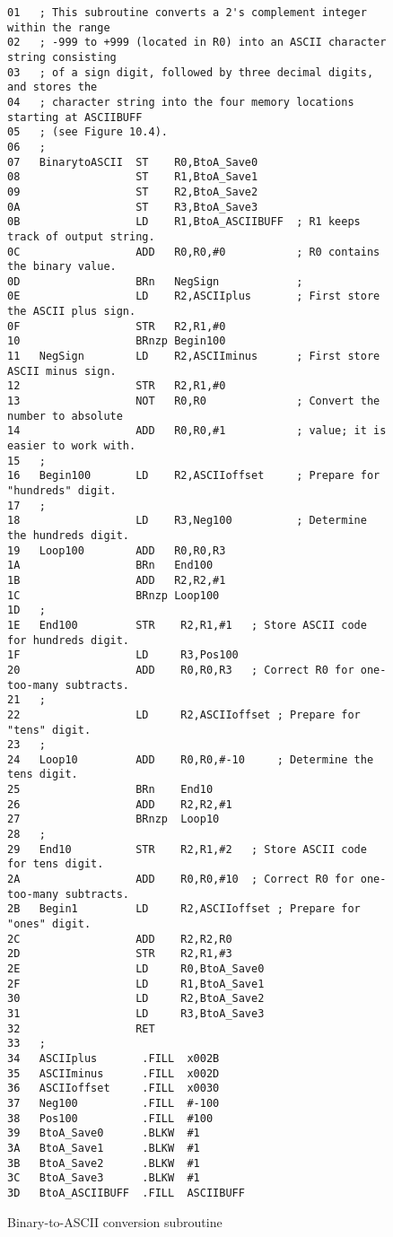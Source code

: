 \documentclass{patt}
\begin{document}
\begin{figure}[h!]
\begin{minipage}{36pc}
\begin{Verbatim}[fontsize=\fontsize{9}{11}\selectfont]
01   ; This subroutine converts a 2's complement integer within the range 
02   ; -999 to +999 (located in R0) into an ASCII character string consisting 
03   ; of a sign digit, followed by three decimal digits, and stores the 
04   ; character string into the four memory locations starting at ASCIIBUFF 
05   ; (see Figure 10.4).
06   ;
07   BinarytoASCII  ST    R0,BtoA_Save0
08                  ST    R1,BtoA_Save1
09                  ST    R2,BtoA_Save2
0A                  ST    R3,BtoA_Save3
0B                  LD    R1,BtoA_ASCIIBUFF  ; R1 keeps track of output string.
0C                  ADD   R0,R0,#0           ; R0 contains the binary value.
0D                  BRn   NegSign            ;
0E                  LD    R2,ASCIIplus       ; First store the ASCII plus sign.
0F                  STR   R2,R1,#0
10                  BRnzp Begin100
11   NegSign        LD    R2,ASCIIminus      ; First store ASCII minus sign.
12                  STR   R2,R1,#0
13                  NOT   R0,R0              ; Convert the number to absolute
14                  ADD   R0,R0,#1           ; value; it is easier to work with.
15   ;
16   Begin100       LD    R2,ASCIIoffset     ; Prepare for "hundreds" digit.
17   ;
18                  LD    R3,Neg100          ; Determine the hundreds digit.
19   Loop100        ADD   R0,R0,R3
1A                  BRn   End100
1B                  ADD   R2,R2,#1
1C                  BRnzp Loop100
1D   ;
1E   End100         STR    R2,R1,#1   ; Store ASCII code for hundreds digit.
1F                  LD     R3,Pos100
20                  ADD    R0,R0,R3   ; Correct R0 for one-too-many subtracts.
21   ;
22                  LD     R2,ASCIIoffset ; Prepare for "tens" digit.
23   ;
24   Loop10         ADD    R0,R0,#-10     ; Determine the tens digit.
25                  BRn    End10
26                  ADD    R2,R2,#1
27                  BRnzp  Loop10
28   ;
29   End10          STR    R2,R1,#2   ; Store ASCII code for tens digit.
2A                  ADD    R0,R0,#10  ; Correct R0 for one-too-many subtracts.
2B   Begin1         LD     R2,ASCIIoffset ; Prepare for "ones" digit.
2C                  ADD    R2,R2,R0
2D                  STR    R2,R1,#3
2E                  LD     R0,BtoA_Save0
2F                  LD     R1,BtoA_Save1
30                  LD     R2,BtoA_Save2
31                  LD     R3,BtoA_Save3
32                  RET
33   ;
34   ASCIIplus       .FILL  x002B
35   ASCIIminus      .FILL  x002D
36   ASCIIoffset     .FILL  x0030
37   Neg100          .FILL  #-100
38   Pos100          .FILL  #100
39   BtoA_Save0      .BLKW  #1
3A   BtoA_Save1      .BLKW  #1
3B   BtoA_Save2      .BLKW  #1
3C   BtoA_Save3      .BLKW  #1
3D   BtoA_ASCIIBUFF  .FILL  ASCIIBUFF
\end{Verbatim}
\caption{Binary-to-ASCII conversion subroutine}
\label{fig:code.binary.to.ascii}
\end{minipage}
\end{figure}
\end{document}
